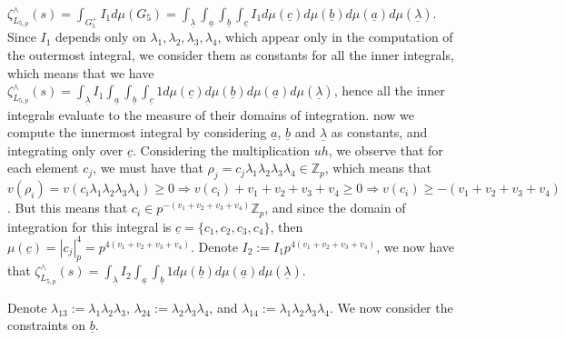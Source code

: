 \documentclass{article}
\begin{document}
$\zeta_{L_{5,p}}^{\wedge}(s)=\displaystyle\int_{{G_{5}^{+}}}{I_{1}}d\mu(G_{5})=\displaystyle\int_{\underline\lambda}\int_{\underline{a}}\int_{\underline{b}}\int_{\underline{c}}{I_{1}}d\mu(\underline{c})d\mu(\underline{b})d\mu(\underline{a})d\mu(\underline{\lambda})$. Since $I_{1}$ depends only on $\lambda_{1},\lambda_{2},\lambda_{3},\lambda_{4}$, which appear only in the computation of the outermost integral, we consider them as constants for all the inner integrals, which means that  we have $\zeta_{L_{5,p}}^{\wedge}(s)=\displaystyle\int_{\underline\lambda}I_{1}\int_{\underline{a}}\int_{\underline{b}}\int_{\underline{c}}1d\mu(\underline{c})d\mu(\underline{b})d\mu(\underline{a})d\mu(\underline{\lambda})$, hence all the inner integrals evaluate to the measure of their domains of integration.
now we compute the innermost integral by considering $\underline{a}$, $\underline{b}$ and $\underline{\lambda}$ as constants, and integrating only over $\underline{c}$. Considering the multiplication $uh$, we observe that for each element $c_{j}$, we must have that $\rho_{j}=c_{j}\lambda_{1}\lambda_{2}\lambda_{3}\lambda_{4}\in\mathbb{Z}_{p}$, which means that $v(\rho_{i})=v(c_{i}\lambda_{1}\lambda_{2}\lambda_{3}\lambda_{4})\geq{0}\Rightarrow{v(c_{i})+v_{1}+v_{2}+v_{3}+v_{4}}\geq{0}\Rightarrow{v(c_{i})\geq{-(v_{1}+v_{2}+v_{3}+v_{4})}}$. But this means that $c_{i}\in{p^{-(v_{1}+v_{2}+v_{3}+v_{4})}\mathbb{Z}_{p}}$, and since the domain of integration for this integral is $\underline{c}=\{c_{1},c_{2},c_{3},c_{4}\}$, then $\mu(\underline{c})=|c_{j}|_{p}^{4}=p^{4(v_{1}+v_{2}+v_{3}+v_{4})}$. Denote $I_{2}:=I_{1}p^{4(v_{1}+v_{2}+v_{3}+v_{4})}$, we now have that $\zeta_{L_{5,p}}^{\wedge}(s)=\displaystyle\int_{\underline\lambda}I_{2}\int_{\underline{a}}\int_{\underline{b}}1d\mu(\underline{b})d\mu(\underline{a})d\mu(\underline{\lambda})$.

Denote $\lambda_{13}:=\lambda_{1}\lambda_{2}\lambda_{3}$, $\lambda_{24}:=\lambda_{2}\lambda_{3}\lambda_{4}$, and $\lambda_{14}:=\lambda_{1}\lambda_{2}\lambda_{3}\lambda_{4}$. We now consider the constraints on $\underline{b}$. 
\end{document}
